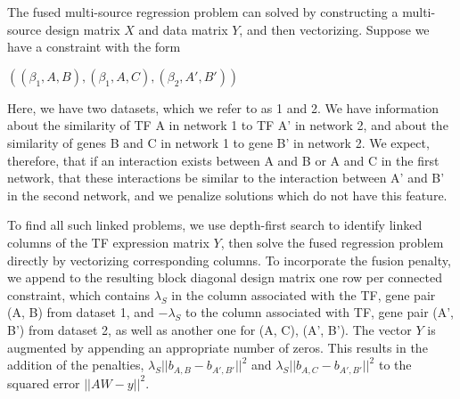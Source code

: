 \documentclass[11pt]{article}
\begin{document}


The fused multi-source regression problem can solved by constructing a multi-source design matrix $X$ and data matrix $Y$, and then vectorizing.
Suppose we have a constraint with the form


$((\beta_1, A, B), (\beta_1, A, C), (\beta_2, A', B'))$

Here, we have two datasets, which we refer to as 1 and 2. We have information about the similarity of TF A in network 1 to TF A' in network 2, and about the similarity of genes B and C in network 1 to gene B' in network 2. We expect, therefore, that if an interaction exists between A and B or A and C in the first network, that these interactions be similar to the interaction between A' and B' in the second network, and we penalize solutions which do not have this feature. 

To find all such linked problems, we use depth-first search to identify linked columns of the TF expression matrix $Y$, then solve the fused regression problem directly by vectorizing corresponding columns. To incorporate the fusion penalty, we append to the resulting block diagonal design matrix one row per connected constraint, which contains $\lambda_S$ in the column associated with the TF, gene pair (A, B) from dataset 1, and $-\lambda_S$ to the column associated with TF, gene pair (A', B') from dataset 2, as well as another one for (A, C), (A', B'). The vector $Y$ is augmented by appending an appropriate number of zeros. This results in the addition of the penalties, $\lambda_S||b_{A,B} - b_{A',B'}||^{2}$ and $\lambda_S||b_{A,C} - b_{A',B'}||^{2}$ to the squared error $||AW-y||^2$.
\end{document}
